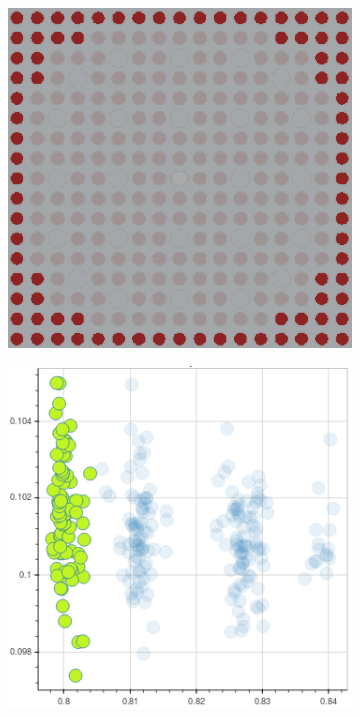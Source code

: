 \documentclass[12pt,twoside]{mitthesis-exec}
\begin{document}
\begin{figure}[h!]
\centering
\begin{subfigure}{0.45\textwidth}
  \centering
  \includegraphics[width=0.9\linewidth]{figures/unsupervised/features/assm-16/u238-capt/mean-std/geometry-2}
  \caption{}
  \label{fig:chap10-capt-mean-std-geom-2}
\end{subfigure}%
\begin{subfigure}{0.45\textwidth}
  \centering
  \includegraphics[width=0.9\linewidth]{figures/unsupervised/features/assm-16/u238-capt/mean-std/mgxs-2}

\end{subfigure}
\end{figure}
\end{document}
